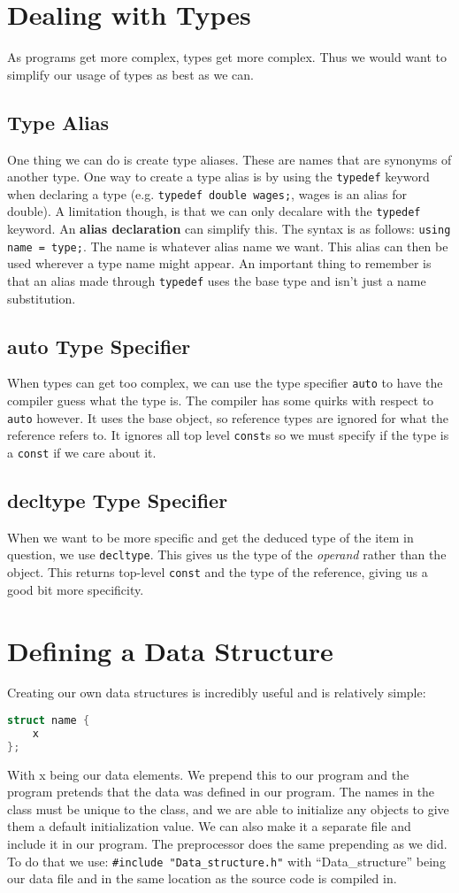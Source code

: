 \documentclass[12pt, a4paper]{report}
\begin{document}
\section{Dealing with Types}
As programs get more complex, types get more complex. Thus we would want to simplify our usage of types as best as we can. 
\subsection{Type Alias}
One thing we can do is create type aliases. These are names that are synonyms of another type. One way to create a type alias is by using the \verb|typedef| keyword when declaring a type (e.g. \verb|typedef double wages;|, wages is an alias for double). A limitation though, is that we can only decalare with the \verb|typedef| keyword.
An \textbf{alias declaration} can simplify this. The syntax is as follows: \verb|using name = type;|. The name is whatever alias name we want. This alias can then be used wherever a type name might appear. An important thing to remember is that an alias made through \verb|typedef| uses the base type and isn't just a name substitution.
\subsection{auto Type Specifier}
When types can get too complex, we can use the type specifier \verb|auto| to have the compiler guess what the type is. The compiler has some quirks with respect to \verb|auto| however. It uses the base object, so reference types are ignored for what the reference refers to. It ignores all top level \verb|const|s so we must specify if the type is a \verb|const| if we care about it.
\subsection{decltype Type Specifier}
When we want to be more specific and get the deduced type of the item in question, we use \verb|decltype|. This gives us the type of the \emph{operand} rather than the object. This returns top-level \verb|const| and the type of the reference, giving us a good bit more specificity.
\section{Defining a Data Structure}
Creating our own data structures is incredibly useful and is relatively simple:
\begin{lstlisting}[language=C++]
struct name {
    x
};
\end{lstlisting}
With x being our data elements. We prepend this to our program and the program pretends that the data was defined in our program. The names in the class must be unique to the class, and we are able to initialize any objects to give them a default initialization value. We can also make it a separate file and include it in our program. The preprocessor does the same prepending as we did. To do that we use: \verb|#include "Data_structure.h"| with ``Data\_structure'' being our data file and in the same location as the source code is compiled in.
\end{document}
